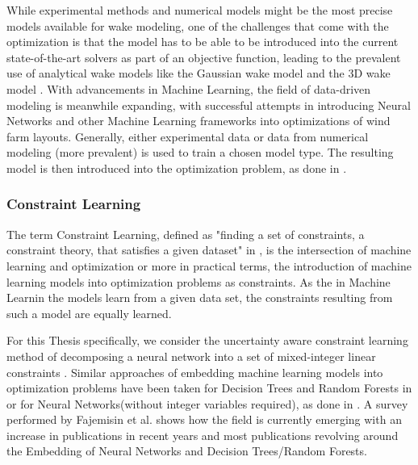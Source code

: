 While experimental methods and numerical models might be the most precise models available for wake modeling, one of the challenges that come with the optimization is that the model has to be able to be introduced into the current state-of-the-art solvers as part of an objective function, leading to the prevalent use of analytical wake models like the Gaussian wake model and the 3D wake model  \cite{WANG2024118508}. With advancements in Machine Learning, the field of data-driven modeling is meanwhile expanding, with successful attempts in introducing Neural Networks and other Machine Learning frameworks into optimizations of wind farm layouts. Generally, either experimental data or data from numerical modeling (more prevalent) is used to train  a chosen model type. The resulting model is then introduced into the optimization problem, as done in \cite{YANG2023119240} \cite{wes-9-869-2024} \cite{TI2020114025} \cite{TI2021618}. 

\subsubsection{Constraint Learning}

The term Constraint Learning, defined as "finding a set of constraints, a constraint theory, that satisfies a given dataset" in \cite{de2018learning}, is the intersection of machine learning and optimization or more in practical terms, the introduction of machine learning models into optimization problems as constraints. As the in Machine Learnin the models learn from a given data set, the constraints resulting from such a model are equally learned. \cite{de2018learning} 

For this Thesis specifically, we consider the uncertainty aware constraint learning method of decomposing a neural network into a set of mixed-integer linear constraints  \cite{ALCANTARA2023120895} \cite{ALCANTARA2025127876}. Similar approaches of embedding machine learning models into optimization problems have been taken for Decision Trees and Random Forests in \cite{preprintBonfiettiEmbeddDecisionTrees} or for Neural Networks(without integer variables required), as done in \cite{dealba2024reformulationembeddingneuralnetwork}. A survey performed by Fajemisin et al.\cite{FAJEMISIN20241} shows how the field is currently emerging with an increase in publications in recent years and most publications revolving around the Embedding of Neural Networks and Decision Trees/Random Forests.
